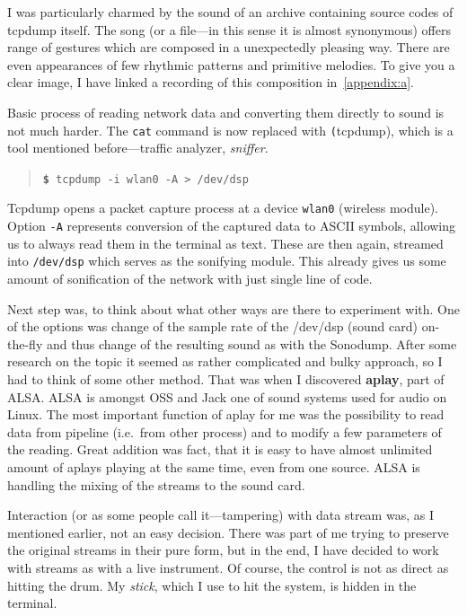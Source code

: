 \documentclass[12pt,a4paper,oneside]{report}
\begin{document}
I was particularly charmed by the sound of an archive containing source codes of tcpdump itself. The song (or a file---in this sense it is almost synonymous) offers range of gestures which are composed in a unexpectedly pleasing way. There are even appearances of few rhythmic patterns and primitive melodies. To give you a clear image, I have linked a recording of this composition in~\autoref{appendix:a}.

Basic process of reading network data and converting them directly to sound is not much harder. The \texttt{cat} command is now replaced with \texttt(tcpdump), which is a tool mentioned before---traffic analyzer, \emph{sniffer}.
\begin{quotation}
	\texttt{\textbf{\$} tcpdump -i wlan0 -A > /dev/dsp} 
\end{quotation}

Tcpdump opens a packet capture process at a device \texttt{wlan0} (wireless module). Option \texttt{-A} represents conversion of the captured data to ASCII symbols, allowing us to always read them in the terminal as text. These are then again, streamed into \texttt{/dev/dsp} which serves as the sonifying module. This already gives us some amount of sonification of the network with just single line of code. 

Next step was, to think about what other ways are there to experiment with. One of the options was change of the sample rate of the /dev/dsp (sound card) on-the-fly and thus change of the resulting sound as with the Sonodump. After some research on the topic it seemed as rather complicated and bulky approach, so I had to think of some other method. That was when I discovered \textbf{aplay}, part of ALSA. ALSA is amongst OSS and Jack one of sound systems used for audio on Linux. The most important function of aplay for me was the possibility to read data from pipeline (i.e.\ from other process) and to modify a few parameters of the reading. Great addition was fact, that it is easy to have almost unlimited amount of aplays playing at the same time, even from one source. ALSA is handling the mixing of the streams to the sound card.

Interaction (or as some people call it---tampering) with data stream was, as I mentioned earlier, not an easy decision. There was part of me trying to preserve the original streams in their pure form, but in the end, I have decided to work with streams as with a live instrument. Of course, the control is not as direct as hitting the drum. My \emph{stick}, which I use to hit the system, is hidden in the terminal. 
\end{document}
